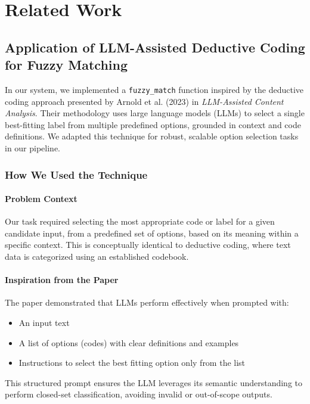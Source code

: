 \documentclass{article}
\begin{document}
\section{Related Work}
\subsection{Application of LLM-Assisted Deductive Coding for Fuzzy Matching}

In our system, we implemented a \texttt{fuzzy\_match} function inspired by the deductive coding approach presented by Arnold et al. (2023) in \textit{LLM-Assisted Content Analysis}. Their methodology uses large language models (LLMs) to select a single best-fitting label from multiple predefined options, grounded in context and code definitions. We adapted this technique for robust, scalable option selection tasks in our pipeline.

\subsubsection{How We Used the Technique}

\paragraph{Problem Context}
Our task required selecting the most appropriate code or label for a given candidate input, from a predefined set of options, based on its meaning within a specific context. This is conceptually identical to deductive coding, where text data is categorized using an established codebook.

\paragraph{Inspiration from the Paper}
The paper demonstrated that LLMs perform effectively when prompted with:
\begin{itemize}
    \item An input text
    \item A list of options (codes) with clear definitions and examples
    \item Instructions to select the best fitting option only from the list
\end{itemize}
This structured prompt ensures the LLM leverages its semantic understanding to perform closed-set classification, avoiding invalid or out-of-scope outputs.
\end{document}
